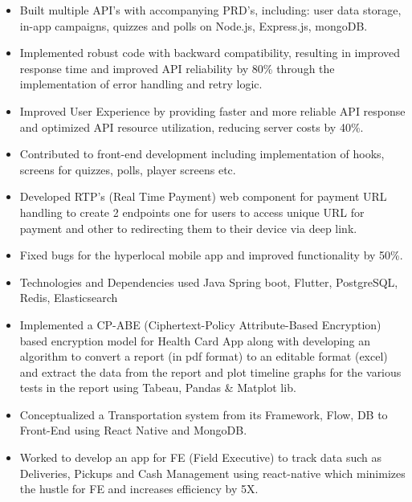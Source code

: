 

\begin{itemize}
    \item  Built multiple API's with accompanying PRD's, including: user data storage, in-app campaigns, quizzes and polls on Node.js, Express.js, mongoDB.
    \item Implemented robust code with backward compatibility, resulting in improved response time and improved API reliability by 80\% through the implementation of error handling and retry logic.
    \item Improved User Experience by providing faster and more reliable API response and optimized API resource utilization, reducing server costs by 40\%.
    \item Contributed to front-end development including implementation of hooks, screens for quizzes, polls, player screens etc.
\end{itemize}

\begin{itemize}
    \item Developed RTP’s (Real Time Payment) web component for payment URL handling to create 2 endpoints one for users to access unique URL for payment and other to redirecting them to their device via deep link.
    \item Fixed bugs for the hyperlocal mobile app and improved functionality by 50\%.
    \item Technologies and Dependencies used Java Spring boot, Flutter, PostgreSQL, Redis, Elasticsearch
\end{itemize}

\begin{itemize}
    \item Implemented a CP-ABE (Ciphertext-Policy Attribute-Based Encryption) based encryption model for Health Card App along with developing an algorithm to convert a report (in pdf format) to an editable format (excel) and extract the data from the report and plot timeline graphs for the various tests in the report using Tabeau, Pandas & Matplot lib.
\end{itemize}

\begin{itemize}
    \item Conceptualized a Transportation system from its Framework, Flow, DB to Front-End using React Native and MongoDB.
    \item Worked to develop an app for FE (Field Executive) to track data such as Deliveries, Pickups and Cash Management using
  react-native which minimizes the hustle for FE and increases efficiency by 5X.
\end{itemize}